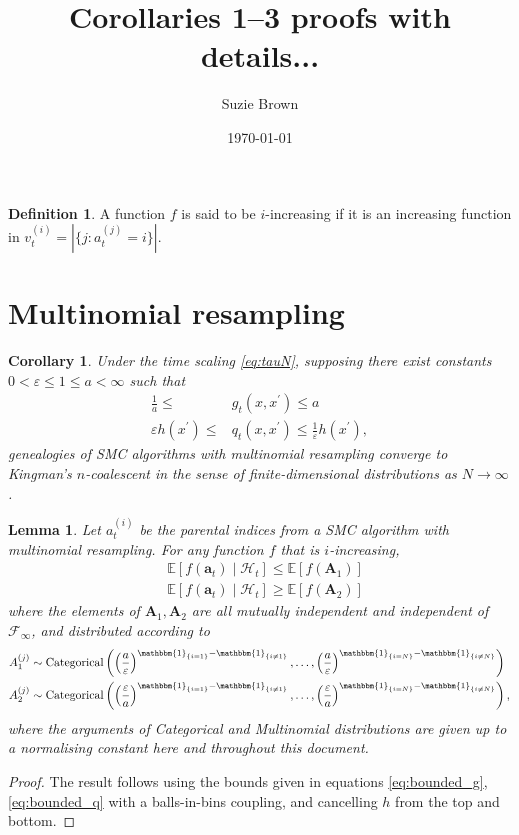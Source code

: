 \documentclass[fleqn]{article}
\title{Corollaries 1--3 proofs with details...}
\author{Suzie Brown}
\date{\today}
\newtheorem{lemma}{Lemma}
\newtheorem{corollary}{Corollary}
\theoremstyle{definition}
\newtheorem{defn}{Definition}
\newcommand{\E}{\mathbb{E}}
\newcommand{\1}[1]{\mathbbm{1}_{\{#1\}}}
\newcommand{\Cat}{\operatorname{Categorical}}
\newcommand{\vt}[2][t]{v_{#1}^{(#2)}}
\begin{document}
\maketitle
\thispagestyle{fancy}

\begin{defn}
A function $f$ is said to be $i$-increasing if it is an increasing function in $\vt{i} = |\{j : a_t^{(j)} = i \}|$.
\end{defn}

\section*{Multinomial resampling}

\begin{corollary}\label{thm:mn_newassns}
Under the time scaling \eqref{eq:tauN}, supposing there exist constants $0<\varepsilon\leq 1\leq a<\infty$ such that
\begin{align}
\frac{1}{a} \leq &g_t(x, x^\prime) \leq a \label{eq:bounded_g}\\
\varepsilon h(x^\prime) \leq &q_t(x, x^\prime) \leq \frac{1}{\varepsilon} h(x^\prime) ,\label{eq:bounded_q}
\end{align}
genealogies of SMC algorithms with multinomial resampling converge to Kingman's $n$-coalescent in the sense of finite-dimensional distributions as $N\to\infty$.
\end{corollary}

\begin{lemma}\label{lem:i_increasing}
Let $a_t^{(i)}$ be the parental indices from a SMC algorithm with multinomial resampling. For any function $f$ that is $i$-increasing, 
\begin{align*}
& \E[f(\mathbf{a}_t) \mid \mathcal{H}_t] \leq \E[f(\mathbf{A}_1)] \\
& \E[f(\mathbf{a}_t) \mid \mathcal{H}_t] \geq \E[f(\mathbf{A}_2)]
\end{align*}
where the elements of $\mathbf{A}_1, \mathbf{A}_2$ are all mutually independent and independent of $\mathcal{F}_{\infty}$, and distributed according to
\begin{align*}
& A_1^{(j)} \sim \Cat\left( \left( \frac{a}{\varepsilon} \right)^{\1{i=1} -\1{i\neq 1}} ,\dots, \left( \frac{a}{\varepsilon} \right)^{\1{i=N} -\1{i\neq N}} \right) \\
& A_2^{(j)} \sim \Cat\left( \left( \frac{\varepsilon}{a} \right)^{\1{i=1} -\1{i\neq 1}} ,\dots, \left( \frac{\varepsilon}{a} \right)^{\1{i=N} -\1{i\neq N}} \right),
\end{align*}
where the arguments of Categorical and Multinomial distributions are given up to a normalising constant here and throughout this document.
\end{lemma}
\begin{proof}
The result follows using the bounds given in equations \eqref{eq:bounded_g}, \eqref{eq:bounded_q} with a balls-in-bins coupling, and cancelling $h$ from the top and bottom.
\end{proof}
\end{document}
